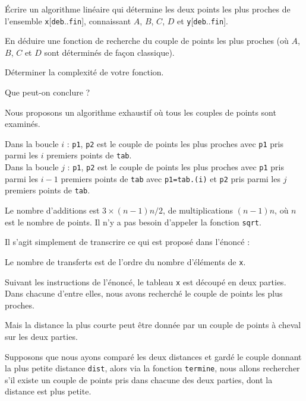 Écrire un algorithme linéaire qui détermine les deux points les plus proches de l'ensemble \texttt{x}[\texttt{deb}..\texttt{fin}], connaissant $A$, $B$, $C$, $D$ et \texttt{y}[\texttt{deb}..\texttt{fin}].
\medskip

En déduire une fonction de recherche du couple de points les plus proches (où $A$, $B$, $C$ et $D$ sont déterminés de façon classique).
\medskip

Déterminer la complexité de votre fonction.
\medskip

Que peut-on conclure ?

\Corrige

\Q
Nous proposons un algorithme exhaustif où tous les couples de points sont examinés.


\bigskip



Dans la boucle $i$ : \texttt{p1}, \texttt{p2} est le couple de points les plus proches avec \texttt{p1} pris parmi les $i$ premiers points de \texttt{tab}.\\
Dans la boucle $j$ : \texttt{p1}, \texttt{p2} est le couple de points les plus proches avec \texttt{p1} pris parmi les $i-1$ premiers points de \texttt{tab} avec \texttt{p1=tab.(i)} et \texttt{p2} pris parmi les $j$ premiers points de \texttt{tab}.
\medskip

Le nombre d'additions est $3 \times (n-1)n/2$, de multiplications $(n-1)n$, où $n$ est le nombre de points. Il n'y a pas besoin d'appeler la fonction \texttt{sqrt}.

\Q
Il s'agit simplement de transcrire ce qui est proposé dans l'énoncé :



Le nombre de transferts est de l'ordre du nombre d'éléments de \texttt{x}.

\Q
Suivant les instructions de l'énoncé, le tableau \texttt{x} est découpé en deux parties. Dans chacune d'entre elles, nous avons recherché le couple de points les plus proches.
\medskip

Mais la distance la plus courte peut être donnée par un couple de points à cheval sur les deux parties.
\medskip

Supposons que nous ayons comparé les deux distances et gardé le couple donnant la plus petite distance \texttt{dist}, alors via la fonction \texttt{termine}, nous allons rechercher s'il existe un couple de points pris dans chacune des deux parties, dont la distance est plus petite.
\medskip

